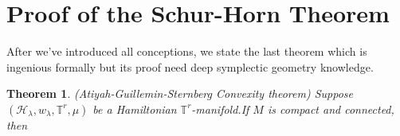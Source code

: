 \documentclass[11pt]{amsart}
\numberwithin{equation}{section}
\theoremstyle{plain}
\newtheorem{theorem}{Theorem}[section]
\theoremstyle{plain}
\numberwithin{equation}{section}
\theoremstyle{remark}
\begin{document}
\section{Proof of the Schur-Horn Theorem} 

After we’ve introduced all conceptions, we state the last theorem which is  ingenious formally but its proof need deep symplectic  geometry knowledge.
\begin{theorem}(Atiyah-Guillemin-Sternberg Convexity theorem)
	Suppose $(\mathcal{H}_\lambda,w_\lambda, \mathbb{T}^r, \mu)$ be a Hamiltonian $\mathbb{T}^r$-manifold.If $M$ is compact and connected, then
	\begin{center}
	\end{center}

\end{theorem}
\end{document}
